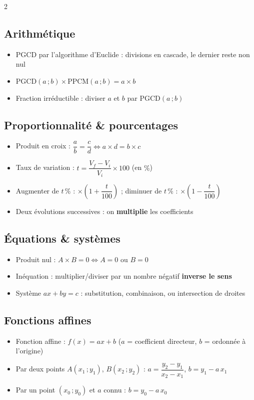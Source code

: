 \begin{multicols}{2}
\subsection*{\color{onbo}Arithmétique}
\begin{itemize}
\item PGCD par l'algorithme d'Euclide : divisions en cascade, le dernier reste non nul
\item $\text{PGCD}(a\,;b)\times\text{PPCM}(a\,;b)=a\times b$
\item Fraction irréductible : diviser $a$ et $b$ par $\text{PGCD}(a\,;b)$
\end{itemize}

\subsection*{\color{onbo}Proportionnalité \& pourcentages}
\begin{itemize}
\item Produit en croix : $\dfrac ab=\dfrac cd\iff a\times d=b\times c$
\item Taux de variation : $t=\dfrac{V_f-V_i}{V_i}\times100$ (en $\%$)
\item Augmenter de $t\,\%$ : $\times\left(1+\dfrac t{100}\right)$ ; diminuer de $t\,\%$ :
$\times\left(1-\dfrac t{100}\right)$
\item Deux évolutions successives : on \textbf{multiplie} les coefficients
\end{itemize}

\subsection*{\color{onbo}Équations \& systèmes}
\begin{itemize}
\item Produit nul : $A\times B=0\iff A=0$ ou $B=0$
\item Inéquation : multiplier/diviser par un nombre négatif \textbf{inverse le sens}
\item Système $ax+by=c$ : substitution, combinaison, ou intersection de droites
\end{itemize}

\subsection*{\color{onbo}Fonctions affines}
\begin{itemize}
\item Fonction affine : $f(x)=ax+b$ ($a$ = coefficient directeur, $b$ = ordonnée à
l'origine)
\item Par deux points $A(x_1\,;y_1)$, $B(x_2\,;y_2)$ : $a=\dfrac{y_2-y_1}{x_2-x_1}$,
$b=y_1-a\,x_1$
\item Par un point $(x_0\,;y_0)$ et $a$ connu : $b=y_0-a\,x_0$
\end{itemize}


\end{multicols}
